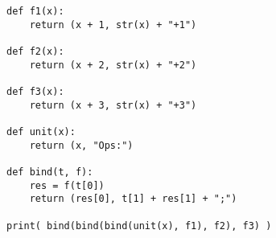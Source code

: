 \begin{lstlisting}
def f1(x):
	return (x + 1, str(x) + "+1")

def f2(x):
	return (x + 2, str(x) + "+2")

def f3(x):
	return (x + 3, str(x) + "+3")

def unit(x):
	return (x, "Ops:")
	
def bind(t, f):
	res = f(t[0])
	return (res[0], t[1] + res[1] + ";")
	
print( bind(bind(bind(unit(x), f1), f2), f3) )
\end{lstlisting}


\newpage
